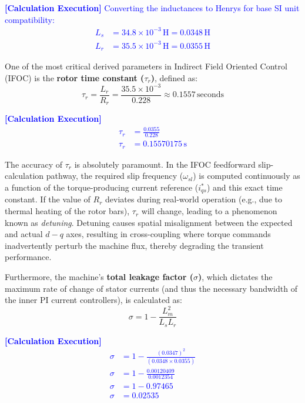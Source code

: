 \documentclass[12pt]{article}
\begin{document}
    \textcolor{blue}{\textbf{[Calculation Execution]} Converting the inductances to Henrys for base SI unit compatibility:
    \begin{align*}
        L_s &= 34.8 \times 10^{-3} \, \text{H} = 0.0348 \, \text{H} \\
        L_r &= 35.5 \times 10^{-3} \, \text{H} = 0.0355 \, \text{H}
    \end{align*}}

One of the most critical derived parameters in Indirect Field Oriented Control (IFOC) is the \textbf{rotor time constant ($\tau_r$)}, defined as:
\begin{equation}
    \tau_r = \frac{L_r}{R_r} = \frac{35.5 \times 10^{-3}}{0.228} \approx 0.1557 \, \text{seconds}
\end{equation}

    \textcolor{blue}{\textbf{[Calculation Execution]} 
    \begin{align*}
        \tau_r &= \frac{0.0355}{0.228} \\
        \tau_r &= 0.15570175 \, \text{s}
    \end{align*}}

The accuracy of $\tau_r$ is absolutely paramount. In the IFOC feedforward slip-calculation pathway, the required slip frequency ($\omega_{sl}$) is computed continuously as a function of the torque-producing current reference ($i_{qs}^*$) and this exact time constant. If the value of $R_r$ deviates during real-world operation (e.g., due to thermal heating of the rotor bars), $\tau_r$ will change, leading to a phenomenon known as \textit{detuning}. Detuning causes spatial misalignment between the expected and actual $d-q$ axes, resulting in cross-coupling where torque commands inadvertently perturb the machine flux, thereby degrading the transient performance.

Furthermore, the machine's \textbf{total leakage factor ($\sigma$)}, which dictates the maximum rate of change of stator currents (and thus the necessary bandwidth of the inner PI current controllers), is calculated as:
\begin{equation}
    \sigma = 1 - \frac{L_m^2}{L_s L_r} %
\end{equation}

    \textcolor{blue}{\textbf{[Calculation Execution]} 
    \begin{align*}
        \sigma &= 1 - \frac{(0.0347)^2}{(0.0348 \times 0.0355)} \\
        \sigma &= 1 - \frac{0.00120409}{0.0012354} \\
        \sigma &= 1 - 0.97465 \\
        \sigma &= 0.02535
    \end{align*}}
\end{document}
